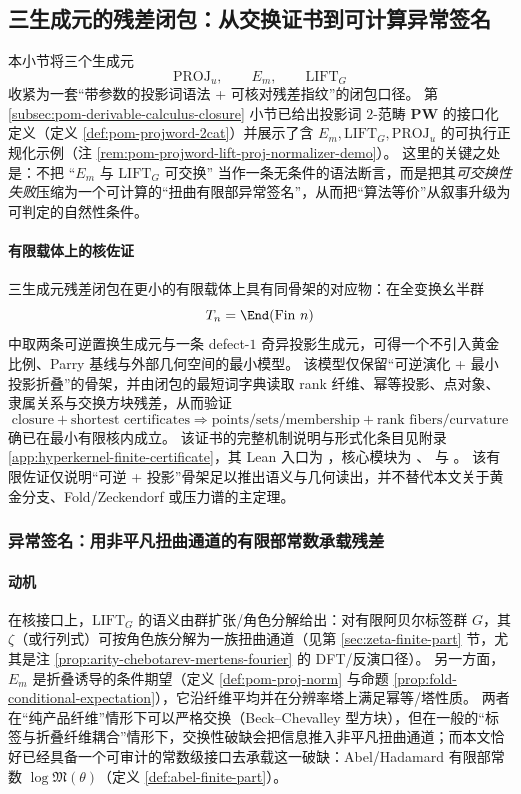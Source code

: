 \subsection{三生成元的残差闭包：从交换证书到可计算异常签名}\label{subsec:pom-three-generator-residual-closure}

本小节将三个生成元
$$
\mathrm{PROJ}_u,\qquad E_m,\qquad \mathrm{LIFT}_G
$$
收紧为一套“带参数的投影词语法 + 可核对残差指纹”的闭包口径。
第 \ref{subsec:pom-derivable-calculus-closure} 小节已给出投影词 $2$-范畴 $\mathbf{PW}$ 的接口化定义（定义 \ref{def:pom-projword-2cat}）并展示了含 \(E_m,\mathrm{LIFT}_G,\mathrm{PROJ}_u\) 的可执行正规化示例（注 \ref{rem:pom-projword-lift-proj-normalizer-demo}）。
这里的关键之处是：不把 “\(E_m\) 与 \(\mathrm{LIFT}_G\) 可交换” 当作一条无条件的语法断言，而是把其\emph{可交换性失败}压缩为一个可计算的“扭曲有限部异常签名”，从而把“算法等价”从叙事升级为可判定的自然性条件。

\paragraph{有限载体上的核佐证}
三生成元残差闭包在更小的有限载体上具有同骨架的对应物：在全变换幺半群
\[
T_n=\End(\mathrm{Fin}\ n)
\]
中取两条可逆置换生成元与一条 defect-\(1\) 奇异投影生成元，可得一个不引入黄金比例、Parry 基线与外部几何空间的最小模型。
该模型仅保留“可逆演化 + 最小投影折叠”的骨架，并由闭包的最短词字典读取 rank 纤维、幂等投影、点对象、隶属关系与交换方块残差，从而验证
\[
\text{closure}+\text{shortest certificates}
\Longrightarrow
\text{points/sets/membership}+\text{rank fibers/curvature}
\]
确已在最小有限核内成立。
该证书的完整机制说明与形式化条目见附录 \ref{app:hyperkernel-finite-certificate}，其 Lean 入口为
，核心模块为
、 与
。
该有限佐证仅说明“可逆 + 投影”骨架足以推出语义与几何读出，并不替代本文关于黄金分支、Fold/Zeckendorf 或压力谱的主定理。

\subsubsection{异常签名：用非平凡扭曲通道的有限部常数承载残差}\label{subsec:pom-anom-signature}

\paragraph{动机}
在核接口上，\(\mathrm{LIFT}_G\) 的语义由群扩张/角色分解给出：对有限阿贝尔标签群 \(G\)，其 \(\zeta\)（或行列式）可按角色族分解为一族扭曲通道（见第 \ref{sec:zeta-finite-part} 节，尤其是注 \ref{prop:arity-chebotarev-mertens-fourier} 的 DFT/反演口径）。
另一方面，\(E_m\) 是折叠诱导的条件期望（定义 \ref{def:pom-proj-norm} 与命题 \ref{prop:fold-conditional-expectation}），它沿纤维平均并在分辨率塔上满足幂等/塔性质。
两者在“纯产品纤维”情形下可以严格交换（Beck--Chevalley 型方块），但在一般的“标签与折叠纤维耦合”情形下，交换性破缺会把信息推入非平凡扭曲通道；而本文恰好已经具备一个可审计的常数级接口去承载这一破缺：Abel/Hadamard 有限部常数 \(\log\mathfrak{M}(\theta)\)（定义 \ref{def:abel-finite-part}）。


